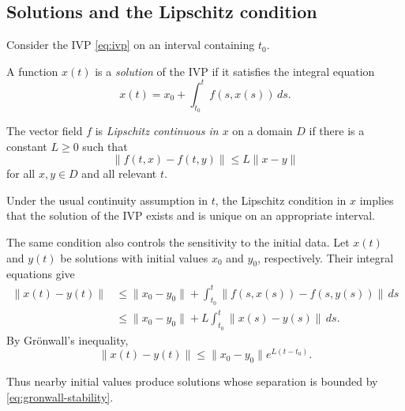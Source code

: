 \subsection{Solutions and the Lipschitz condition}

Consider the IVP \eqref{eq:ivp} on an interval containing $t_0$.

\begin{definition}
  A function $x(t)$ is a \emph{solution} of the IVP if it satisfies the
  integral equation
  \[
    x(t)=x_0+\int_{t_0}^t f(s,x(s))\,ds.
  \]
\end{definition}

\begin{definition}
  The vector field $f$ is \emph{Lipschitz continuous in $x$} on a domain
  $D$ if there is a constant $L\geq 0$ such that
  \[
    \lVert f(t,x)-f(t,y)\rVert
    \leq L\lVert x-y\rVert
  \]
  for all $x,y\in D$ and all relevant $t$.
\end{definition}

Under the usual continuity assumption in $t$, the Lipschitz condition in
$x$ implies that the solution of the IVP exists and is unique on an
appropriate interval.

The same condition also controls the sensitivity to the initial data. Let
$x(t)$ and $y(t)$ be solutions with initial values $x_0$ and $y_0$,
respectively. Their integral equations give
\begin{align*}
  \lVert x(t)-y(t)\rVert
  &\leq \lVert x_0-y_0\rVert
    +\int_{t_0}^t
      \lVert f(s,x(s))-f(s,y(s))\rVert\,ds\\
  &\leq \lVert x_0-y_0\rVert
    +L\int_{t_0}^t\lVert x(s)-y(s)\rVert\,ds.
\end{align*}
By Gr\"onwall's inequality,
\begin{equation}\label{eq:gronwall-stability}
  \lVert x(t)-y(t)\rVert
  \leq \lVert x_0-y_0\rVert e^{L(t-t_0)}.
\end{equation}

\begin{center}
\end{center}

Thus nearby initial values produce solutions whose separation is bounded
by \eqref{eq:gronwall-stability}.
